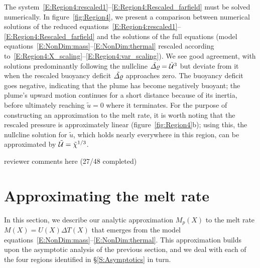 \documentclass[openacc]{rsproca_new}%
\newcommand{\red}[1]{{\color{red} #1}}
\begin{document}
The system~\eqref{E:Region4:rescaled1}--\eqref{E:Region4:Rescaled_farfield} must be solved numerically. In figure~\ref{fig:Region4}, we present a comparison between numerical solutions of the reduced equations~\eqref{E:Region4:rescaled1}--\eqref{E:Region4:Rescaled_farfield} and the solutions of the full equations (model equations~\eqref{E:NonDim:mass}--\eqref{E:NonDim:thermal} rescaled according to~\eqref{E:Region4:X_scaling}--\eqref{E:Region4:var_scaling}). We see good agreement, with solutions predominantly following the nullcline $\tilde{\varDelta \varrho} = \tilde{\mathcal{U}}^3$ but deviate from it when the rescaled buoyancy deficit $\tilde{\varDelta \varrho}$ approaches zero. The buoyancy deficit goes negative, indicating that the plume has become negatively buoyant; the plume's upward motion continues for a short distance because of its inertia, before ultimately reaching $\tilde{u} = 0$ where it terminates. For the purpose of constructing an approximation to the melt rate, it is worth noting that the rescaled pressure is approximately linear (figure~\ref{fig:Region4}b); using this, the nullcline solution for $\tilde{u}$, which holds nearly everywhere in this region, can be approximated by $\tilde{\mathcal{U}} = \tilde{\chi}^{1/3}$.


\red{reviewer comments here (27/48 completed)}

\section{Approximating the melt rate}\label{S:MeltRate}
In this section, we describe our analytic approximation $M_p(X)$ to the melt rate $M(X) = U(X)\Delta T(X)$ that emerges from the model equations~\eqref{E:NonDim:mass}--\eqref{E:NonDim:thermal}. This approximation builds upon the asymptotic analysis of the previous section, and we deal with each of the four regions identified in \S\ref{S:Asymptotics} in turn.
\end{document}
